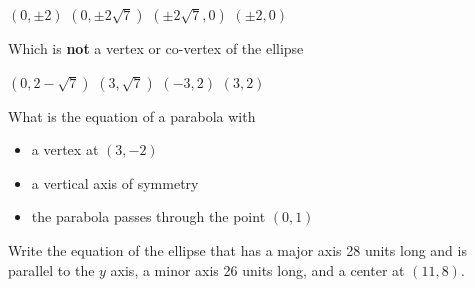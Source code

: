 \documentclass[11pt]{exam}
\begin{document}
\begin{questions}
\begin{minipage}{\linewidth}
\begin{choices}
	\choice $(0, \pm 2)$
	\choice $(0, \pm 2\sqrt7)$
	\CorrectChoice $(\pm 2\sqrt7,0)$
	\choice $(\pm 2,0)$
\end{choices} \answerline
\vspace{0.5in}
\end{minipage}
\begin{minipage}{\linewidth}
\question[3]  Which is \textbf{not} a vertex or co-vertex of the ellipse 

\begin{choices}
	\choice $(0,2-\sqrt{7})$
	\CorrectChoice $(3,\sqrt{7})$
	\choice $(-3,2)$
	\choice $(3,2)$
\end{choices} \answerline
\vspace{0.5in}


\end{minipage}
\begin{minipage}{\linewidth}
\question[3] What is the equation of a parabola with
\begin{itemize}
	\item a vertex
 at $(3, -2)$
 \item a vertical axis of symmetry
 \item the parabola passes through the point $(0, 1)$
\end{itemize}

 \begin{choices}
\choice {}
\choice {}
\CorrectChoice {}
\choice {}
\choice {}
\end{choices} \answerline
\vspace{0.5in}


\end{minipage}
\begin{minipage}{\linewidth}
\question[3] Write the equation of the ellipse that has a major axis 28 units long and is parallel to the $y$ axis,
 a minor axis 26 units long, and a center at $(11, 8)$.
 \vspace{1ex}


\end{minipage}
\end{questions}
\end{document}
